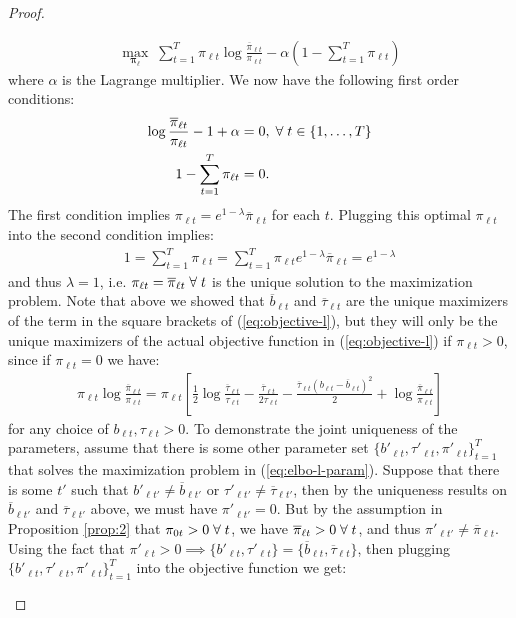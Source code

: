 \begin{proof}
\begin{enumerate}[label=\roman*.]
\begin{align*}
    \max_{\pmb{\pi}_\ell} \; \sum_{t=1}^T \pi_{\ell t} \log \frac{\overline{\pi}_{\ell t}}{\pi_{\ell t}} - \alpha \left(1 - \sum_{t=1}^T \pi_{\ell t}\right) 
\end{align*}
where $\alpha$ is the Lagrange multiplier. We now have the following first order conditions:
\begin{align*}
    \log \frac{\overline{\pi}_{\ell t}}{\pi_{\ell t}}  -1 + \alpha &=0, \;\forall\; t \in \{1, \ldots, T\} \\
    1 - \sum_{t=1}^T \pi_{\ell t} &= 0.
\end{align*}
The first condition implies $\pi_{\ell t} = e^{1- \lambda}\overline{\pi}_{\ell t}$ for each $t$. Plugging this optimal $\pi_{\ell t}$ into the second condition implies:
\begin{align*}
   1 = \sum_{t=1}^T \pi_{\ell t} = \sum_{t=1}^T \pi_{\ell t} e^{1- \lambda}\overline{\pi}_{\ell t} =  e^{1- \lambda}
\end{align*}
and thus $\lambda=1$, i.e. $\pi_{\ell t} = \overline{\pi}_{\ell t} \;\forall\; t$ is the unique solution to the maximization problem. Note that above we showed that $\overline{b}_{\ell t}$ and $\overline{\tau}_{\ell t}$ are the unique maximizers of the term in the square brackets of (\ref{eq:objective-l}), but they will only be the unique maximizers of the actual objective function in (\ref{eq:objective-l}) if $\pi_{\ell t} > 0$, since if $\pi_{\ell t}=0$ we have:
\begin{align*}
     \pi_{\ell t}\log \frac{\overline{\pi}_{\ell t}}{\pi_{\ell t}} = \pi_{\ell t}\left[ \frac{1}{2}\log \frac{\overline{\tau}_{\ell t}}{\tau_{\ell t}} - \frac{\overline{\tau}_{\ell t}}{2\tau_{\ell t}} - \frac{\overline{\tau}_{\ell t}(b_{\ell t}  - \overline{b}_{\ell t})^2}{2} + \log \frac{\overline{\pi}_{\ell t} }{\pi_{\ell t}}\right]
\end{align*}
for any choice of $b_{\ell t}, \tau_{\ell t} >0$. To demonstrate the joint uniqueness of the parameters, assume that there is some other parameter set $\{b'_{\ell t}, \tau'_{\ell t}, \pi'_{\ell t}\}_{t=1}^T$ that solves the maximization problem in (\ref{eq:elbo-l-param}). Suppose that there is some $t'$ such that $b'_{\ell t'} \neq \overline{b}_{\ell t'}$ or $\tau'_{\ell t'}\neq \overline{\tau}_{\ell t'}$, then by the uniqueness results on $\overline{b}_{\ell t'}$ and $\overline{\tau}_{\ell t'}$ above, we must have $\pi'_{\ell t'} = 0$. But by the assumption in Proposition \ref{prop:2} that $\pi_{0t} >0 \;\forall\; t$, we have $\overline{\pi}_{\ell t} > 0 \;\forall\; t$, and thus $\pi'_{\ell t'} \neq \overline{\pi}_{\ell t}$. Using the fact that $\pi'_{\ell t} > 0 \implies \{b'_{\ell t}, \tau'_{\ell t}\} = \{\overline{b}_{\ell t}, \overline{\tau}_{\ell t}\}$, then plugging $\{b'_{\ell t}, \tau'_{\ell t}, \pi'_{\ell t}\}_{t=1}^T$ into the objective function we get:

\end{enumerate}
\end{proof}
